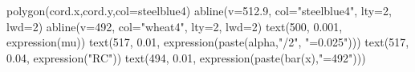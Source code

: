 \documentclass[
  letterpaper,
  DIV=11,
  numbers=noendperiod]{scrartcl}
\newenvironment{Shaded}{\begin{snugshade}}{\end{snugshade}}
\newcommand{\AttributeTok}[1]{\textcolor[rgb]{0.40,0.45,0.13}{#1}}
\newcommand{\DecValTok}[1]{\textcolor[rgb]{0.68,0.00,0.00}{#1}}
\newcommand{\FloatTok}[1]{\textcolor[rgb]{0.68,0.00,0.00}{#1}}
\newcommand{\FunctionTok}[1]{\textcolor[rgb]{0.28,0.35,0.67}{#1}}
\newcommand{\NormalTok}[1]{\textcolor[rgb]{0.00,0.23,0.31}{#1}}
\newcommand{\StringTok}[1]{\textcolor[rgb]{0.13,0.47,0.30}{#1}}
\begin{document}
\begin{Shaded}
\begin{Highlighting}[]
\FunctionTok{polygon}\NormalTok{(cord.x,cord.y,}\AttributeTok{col=}\StringTok{\textquotesingle{}steelblue4\textquotesingle{}}\NormalTok{)}
\FunctionTok{abline}\NormalTok{(}\AttributeTok{v=}\FloatTok{512.9}\NormalTok{, }\AttributeTok{col=}\StringTok{"steelblue4"}\NormalTok{, }\AttributeTok{lty=}\DecValTok{2}\NormalTok{, }\AttributeTok{lwd=}\DecValTok{2}\NormalTok{)}
\FunctionTok{abline}\NormalTok{(}\AttributeTok{v=}\DecValTok{492}\NormalTok{, }\AttributeTok{col=}\StringTok{"wheat4"}\NormalTok{, }\AttributeTok{lty=}\DecValTok{2}\NormalTok{, }\AttributeTok{lwd=}\DecValTok{2}\NormalTok{)}
\FunctionTok{text}\NormalTok{(}\DecValTok{500}\NormalTok{, }\FloatTok{0.001}\NormalTok{, }\FunctionTok{expression}\NormalTok{(mu))}
\FunctionTok{text}\NormalTok{(}\DecValTok{517}\NormalTok{, }\FloatTok{0.01}\NormalTok{, }\FunctionTok{expression}\NormalTok{(}\FunctionTok{paste}\NormalTok{(alpha,}\StringTok{"/2"}\NormalTok{, }\StringTok{"=0.025"}\NormalTok{)))}
\FunctionTok{text}\NormalTok{(}\DecValTok{517}\NormalTok{, }\FloatTok{0.04}\NormalTok{, }\FunctionTok{expression}\NormalTok{(}\StringTok{"RC"}\NormalTok{))}
\FunctionTok{text}\NormalTok{(}\DecValTok{494}\NormalTok{, }\FloatTok{0.01}\NormalTok{, }\FunctionTok{expression}\NormalTok{(}\FunctionTok{paste}\NormalTok{(}\FunctionTok{bar}\NormalTok{(x),}\StringTok{"=492"}\NormalTok{)))}


\end{Highlighting}
\end{Shaded}
\end{document}

